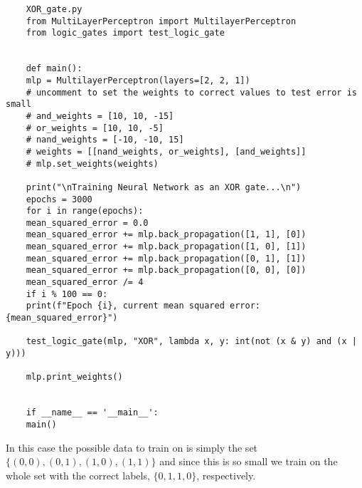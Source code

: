 \documentclass[a4paper]{article}
\begin{document}
    \begin{lstlisting}
    XOR_gate.py
    from MultiLayerPerceptron import MultilayerPerceptron
    from logic_gates import test_logic_gate
    
    
    def main():
    mlp = MultilayerPerceptron(layers=[2, 2, 1])
    # uncomment to set the weights to correct values to test error is small
    # and_weights = [10, 10, -15]
    # or_weights = [10, 10, -5]
    # nand_weights = [-10, -10, 15]
    # weights = [[nand_weights, or_weights], [and_weights]]
    # mlp.set_weights(weights)
    
    print("\nTraining Neural Network as an XOR gate...\n")
    epochs = 3000
    for i in range(epochs):
    mean_squared_error = 0.0
    mean_squared_error += mlp.back_propagation([1, 1], [0])
    mean_squared_error += mlp.back_propagation([1, 0], [1])
    mean_squared_error += mlp.back_propagation([0, 1], [1])
    mean_squared_error += mlp.back_propagation([0, 0], [0])
    mean_squared_error /= 4
    if i % 100 == 0:
    print(f"Epoch {i}, current mean squared error: {mean_squared_error}")
    
    test_logic_gate(mlp, "XOR", lambda x, y: int(not (x & y) and (x | y)))
    
    mlp.print_weights()
    
    
    if __name__ == '__main__':
    main()
    \end{lstlisting}
    In this case the possible data to train on is simply the set \(\{(0, 0), (0, 1), (1, 0), (1, 1)\}\) and since this is so small we train on the whole set with the correct labels, \(\{0, 1, 1, 0\}\), respectively.
\end{document}
